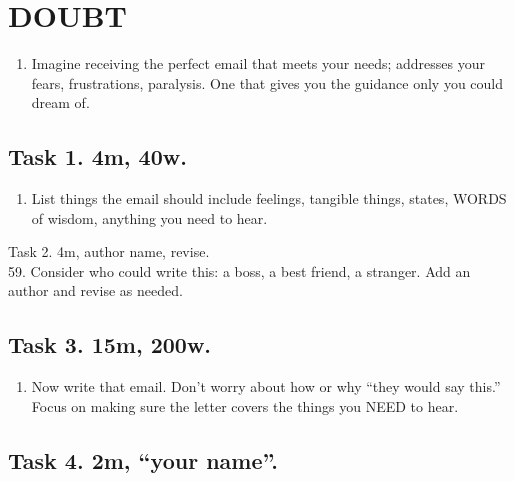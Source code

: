 \documentclass[
]{book}
\providecommand{\tightlist}{%
  \setlength{\itemsep}{0pt}\setlength{\parskip}{0pt}}
\begin{document}
\hypertarget{doubt}{%
\chapter{DOUBT}\label{doubt}}

\begin{enumerate}
\def\labelenumi{\arabic{enumi}.}
\setcounter{enumi}{56}
\tightlist
\item
  Imagine receiving the perfect email that meets your needs; addresses
  your fears, frustrations, paralysis. One that gives you the guidance
  only you could dream of.
\end{enumerate}

\hypertarget{task-1.-4m-40w.}{%
\section{Task 1. 4m, 40w.}\label{task-1.-4m-40w.}}

\begin{enumerate}
\def\labelenumi{\arabic{enumi}.}
\setcounter{enumi}{57}
\tightlist
\item
  List things the email should include feelings, tangible
  things, states, WORDS of wisdom, anything you need to hear.
\end{enumerate}

Task 2. 4m, author name, revise.\\
59. Consider who could write this: a
boss, a best friend, a stranger. Add an author and revise as needed.

\hypertarget{task-3.-15m-200w.}{%
\section{Task 3. 15m, 200w.}\label{task-3.-15m-200w.}}

\begin{enumerate}
\def\labelenumi{\arabic{enumi}.}
\setcounter{enumi}{59}
\tightlist
\item
  Now write that email. Don't worry about how or
  why ``they would say this.'' Focus on making sure the letter covers the
  things you NEED to hear.
\end{enumerate}

\hypertarget{task-4.-2m-your-name.}{%
\section{Task 4. 2m, ``your name''.}\label{task-4.-2m-your-name.}}
\end{document}
